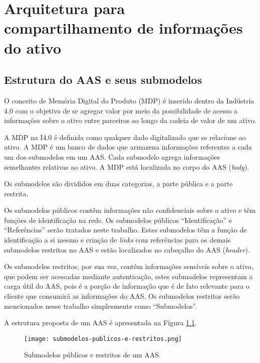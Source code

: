 \chapter{Arquitetura para compartilhamento de informações do ativo}


\section{Estrutura do AAS e seus submodelos}

	O conceito de Memória Digital do Produto (MDP) é inserido dentro da Indústria 4.0 com o objetivo de se agregar valor por meio da possibilidade de acesso a informações sobre o ativo entre parceiros ao longo da cadeia de valor de um ativo.
	
	A MDP na I4.0 é definida como qualquer dado digitalizado que se relacione ao ativo. A MDP é um banco de dados que armazena informações referentes a cada um dos submodelos em um AAS. Cada submodelo agrega informações semelhantes relativas ao ativo. A MDP está localizada no corpo do AAS (\textit{body}).
	
	Os submodelos são divididos em duas categorias, a parte pública e a parte restrita.
	
	Os submodelos públicos contêm informações não confidenciais sobre o ativo e têm funções de identificação na rede. Os submodelos públicos ``Identificação'' e ``Referências'' serão tratados neste trabalho. Estes submodelos têm a função de identificação a si mesmo e criação de \textit{links} com referências para os demais submodelos restritos no AAS e estão localizados no cabeçalho do AAS (\textit{header}).
	
	Os submodelos restritos, por sua vez, contêm informações sensíveis sobre o ativo, que podem ser acessadas mediante autenticação, estes submodelos representam a carga útil do AAS, pois é a porção de informação que é de fato relevante para o cliente que consumirá as informações do AAS. Os submodelos restritos serão mencionados nesse trabalho simplesmente como ``Submodelos''.
	
	A estrutura proposta de um AAS é apresentada na Figura \ref{fig:submodelos-publicos-e-restritos}.
	
	\begin{figure}[hbt!]
		\centering
		\caption{Submodelos públicos e restritos de um AAS.}
		\texttt{[image: submodelos-publicos-e-restritos.png]}
		\label{fig:submodelos-publicos-e-restritos}
	\end{figure}

